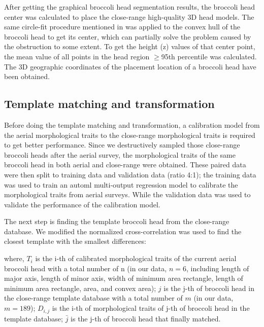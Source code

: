 

After getting the graphical broccoli head segmentation results, the broccoli head center was calculated to place the close-range high-quality 3D head models. The same circle-fit procedure mentioned in \citet{blok_image_2021} was applied to the convex hull of the broccoli head to get its center, which can partially solve the problem caused by the obstruction to some extent. To get the height (z) values of that center point, the mean value of all points in the head region $\geq$95th percentile was calculated. The 3D geographic coordinates of the placement location of a broccoli head have been obtained.

\subsection{Template matching and transformation}

Before doing the template matching and transformation, a calibration model from the aerial morphological traits to the close-range morphological traits is required to get better performance. Since we destructively sampled those close-range broccoli heads after the aerial survey, the morphological traits of the same broccoli head in both aerial and close-range were obtained. These paired data were then split to training data and validation data (ratio 4:1); the training data was used to train an \gls{automl} multi-output regression model \citep{feurer_auto-sklearn_2020} to calibrate the morphological traits from aerial surveys. While the validation data was used to validate the performance of the calibration model.

The next step is finding the template broccoli head from the close-range database. We modified the normalized cross-correlation \citep{yoo_fast_2009} was used to find the closest template with the smallest differences:



\noindent
where, $T_i$ is the i-th of calibrated morphological traits of the current aerial broccoli head with a total number of n (in our data, $n=6$, including length of major axis, length of minor axis, width of minimum area rectangle, length of minimum area rectangle, area, and convex area); $j$ is the j-th of broccoli head in the close-range template database with a total number of $m$ (in our data, $m=189$); $D_{i,j}$ is the i-th of morphological traits of j-th of broccoli head in the template database; $\bar{j}$ is the j-th of broccoli head that finally matched.

